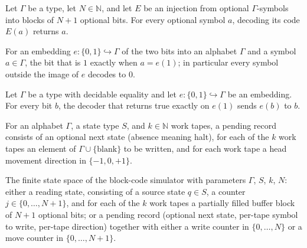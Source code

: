 \begin{lemma}
\label{Turing.FinTM.arDecode_code}
\leanok
{}
Let $\Gamma$ be a type, let $N\in\mathbb{N}$, and let $E$ be an injection from optional
$\Gamma$-symbols into blocks of $N+1$ optional bits. For every optional symbol $a$,
decoding its code $E(a)$ returns $a$.
\end{lemma}

\begin{definition}
\label{Turing.FinTM.arBit}
\leanok
For an embedding $e : \{0,1\} \hookrightarrow \Gamma$ of the two bits into an alphabet
$\Gamma$ and a symbol $a \in \Gamma$, the bit that is $1$ exactly when
$a = e(1)$; in particular every symbol outside the image of $e$ decodes to $0$.
\end{definition}

\begin{lemma}
\label{Turing.FinTM.arBit_embed}
\leanok
{}
Let $\Gamma$ be a type with decidable equality and let $e:\{0,1\}\hookrightarrow\Gamma$
be an embedding. For every bit $b$, the decoder that returns true exactly on $e(1)$
sends $e(b)$ to $b$.
\end{lemma}

\begin{definition}
\label{Turing.FinTM.ArPending}
\leanok
For an alphabet $\Gamma$, a state type $S$, and $k \in \mathbb{N}$ work tapes, a
pending record consists of an optional next state (absence meaning halt), for each of
the $k$ work tapes an element of $\Gamma \cup \{\text{blank}\}$ to be written, and for
each work tape a head movement direction in $\{-1,0,+1\}$.
\end{definition}

\begin{definition}
\label{Turing.FinTM.ArState}
\leanok
{}
The finite state space of the block-code simulator with parameters $\Gamma$, $S$, $k$,
$N$: either a reading state, consisting of a source state $q \in S$, a counter
$j \in \{0,\dots,N+1\}$, and for each of the $k$ work tapes a partially filled buffer
block of $N+1$ optional bits; or a pending record (optional next state, per-tape
symbol to write, per-tape direction) together with either a write counter in
$\{0,\dots,N\}$ or a move counter in $\{0,\dots,N+1\}$.
\end{definition}

